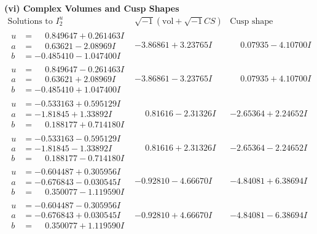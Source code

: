 \documentclass[1p]{elsarticle_modified}
\theoremstyle{definition}
\newcommand{\I}{\sqrt{-1}}
\begin{document}
\newpage\flushleft \textbf{(vi) Complex Volumes and Cusp Shapes}
$$\begin{array}{c|c|c}  
\text{Solutions to }I^u_{2}& \I (\text{vol} + \sqrt{-1}CS) & \text{Cusp shape}\\
 \hline 
\begin{aligned}
u &= \phantom{-}0.849647 + 0.261463 I \\
a &= \phantom{-}0.63621 - 2.08969 I \\
b &= -0.485410 - 1.047400 I\end{aligned}
 & -3.86861 + 3.23765 I & \phantom{-}0.07935 - 4.10700 I \\ \hline\begin{aligned}
u &= \phantom{-}0.849647 - 0.261463 I \\
a &= \phantom{-}0.63621 + 2.08969 I \\
b &= -0.485410 + 1.047400 I\end{aligned}
 & -3.86861 - 3.23765 I & \phantom{-}0.07935 + 4.10700 I \\ \hline\begin{aligned}
u &= -0.533163 + 0.595129 I \\
a &= -1.81845 + 1.33892 I \\
b &= \phantom{-}0.188177 + 0.714180 I\end{aligned}
 & \phantom{-}0.81616 - 2.31326 I & -2.65364 + 2.24652 I \\ \hline\begin{aligned}
u &= -0.533163 - 0.595129 I \\
a &= -1.81845 - 1.33892 I \\
b &= \phantom{-}0.188177 - 0.714180 I\end{aligned}
 & \phantom{-}0.81616 + 2.31326 I & -2.65364 - 2.24652 I \\ \hline\begin{aligned}
u &= -0.604487 + 0.305956 I \\
a &= -0.676843 - 0.030545 I \\
b &= \phantom{-}0.350077 - 1.119590 I\end{aligned}
 & -0.92810 - 4.66670 I & -4.84081 + 6.38694 I \\ \hline\begin{aligned}
u &= -0.604487 - 0.305956 I \\
a &= -0.676843 + 0.030545 I \\
b &= \phantom{-}0.350077 + 1.119590 I\end{aligned}
 & -0.92810 + 4.66670 I & -4.84081 - 6.38694 I \\ \hline\begin{aligned}

\end{aligned}
\end{array}$$
\end{document}
